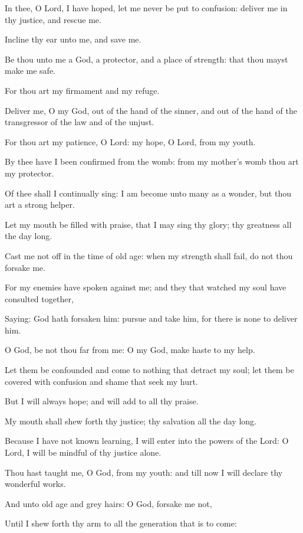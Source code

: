 ﻿\item In thee, O Lord, I have hoped, let me never be put to confusion: deliver me in thy justice, and rescue me.
\item Incline thy ear unto me, and save me.
\item Be thou unto me a God, a protector, and a place of strength: that thou mayst make me safe.
\item For thou art my firmament and my refuge.
\item Deliver me, O my God, out of the hand of the sinner, and out of the hand of the transgressor of the law and of the unjust.
\item For thou art my patience, O Lord: my hope, O Lord, from my youth.
\item By thee have I been confirmed from the womb: from my mother’s womb thou art my protector.
\item Of thee shall I continually sing: I am become unto many as a wonder, but thou art a strong helper.
\item Let my mouth be filled with praise, that I may sing thy glory; thy greatness all the day long.
\item Cast me not off in the time of old age: when my strength shall fail, do not thou forsake me.
\item For my enemies have spoken against me; and they that watched my soul have consulted together,
\item Saying: God hath forsaken him: pursue and take him, for there is none to deliver him.
\item O God, be not thou far from me: O my God, make haste to my help.
\item Let them be confounded and come to nothing that detract my soul; let them be covered with confusion and shame that seek my hurt.
\item But I will always hope; and will add to all thy praise.
\item My mouth shall shew forth thy justice; thy salvation all the day long.
\item Because I have not known learning, I will enter into the powers of the Lord: O Lord, I will be mindful of thy justice alone.
\item Thou hast taught me, O God, from my youth: and till now I will declare thy wonderful works.
\item And unto old age and grey hairs: O God, forsake me not,
\item Until I shew forth thy arm to all the generation that is to come:
